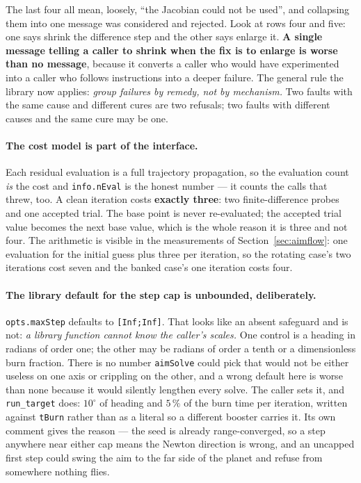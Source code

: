 \documentclass[11pt]{article}
\newcommand{\code}[1]{\texttt{#1}}
\begin{document}
The last four all mean, loosely, ``the Jacobian could not be used'', and
collapsing them into one message was considered and rejected. Look at rows four
and five: one says shrink the difference step and the other says enlarge it.
\textbf{A single message telling a caller to shrink when the fix is to enlarge
is worse than no message}, because it converts a caller who would have
experimented into a caller who follows instructions into a deeper failure. The
general rule the library now applies: \emph{group failures by remedy, not by
mechanism.} Two faults with the same cause and different cures are two
refusals; two faults with different causes and the same cure may be one.

\paragraph{The cost model is part of the interface.} Each residual evaluation
is a full trajectory propagation, so the evaluation count \emph{is} the cost
and \code{info.nEval} is the honest number --- it counts the calls that threw,
too. A clean iteration costs \textbf{exactly three}: two finite-difference
probes and one accepted trial. The base point is never re-evaluated; the
accepted trial value becomes the next base value, which is the whole reason it
is three and not four. The arithmetic is visible in the measurements of
Section~\ref{sec:aimflow}: one evaluation for the initial guess plus three per
iteration, so the rotating case's two iterations cost seven and the banked
case's one iteration costs four.

\paragraph{The library default for the step cap is unbounded, deliberately.}
\code{opts.maxStep} defaults to \code{[Inf;Inf]}. That looks like an absent
safeguard and is not: \emph{a library function cannot know the caller's
scales.} One control is a heading in radians of order one; the other may be
radians of order a tenth or a dimensionless burn fraction. There is no number
\code{aimSolve} could pick that would not be either useless on one axis or
crippling on the other, and a wrong default here is worse than none because it
would silently lengthen every solve. The caller sets it, and
\code{run\_target} does: $10^\circ$ of heading and $5\,\%$ of the burn time per
iteration, written against \code{tBurn} rather than as a literal so a different
booster carries it. Its own comment gives the reason --- the seed is already
range-converged, so a step anywhere near either cap means the Newton direction
is wrong, and an uncapped first step could swing the aim to the far side of the
planet and refuse from somewhere nothing flies.
\end{document}
